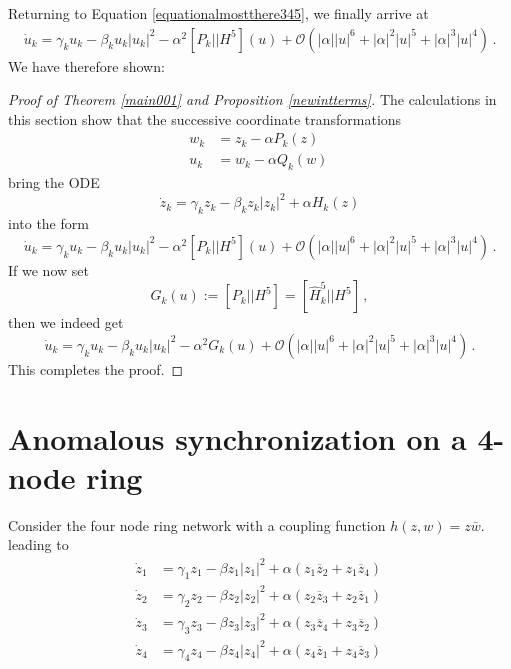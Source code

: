 \documentclass[12pt]{article}
\renewcommand{\mathcal}{\mathscr}
\theoremstyle{plain}
\theoremstyle{definition}
\theoremstyle{remark}
\theoremstyle{remark}
\begin{document}
Returning to Equation \eqref{equationalmostthere345}, we finally arrive at
\begin{align}\label{thethetheequation}
 \dot{u}_k = \gamma_ku_k - \beta_k u_k|u_k|^2  - \alpha^2[P_k|| {H}^5](u) + \mathcal{O}(|\alpha||u|^6 + |\alpha|^2|u|^5 + |\alpha|^3|u|^4)  \, .
\end{align}
We have therefore shown:
\begin{proof}[Proof of Theorem \ref{main001} and Proposition \ref{newintterms}]
The calculations in this section show that the successive coordinate transformations 
\begin{align}
  w_k &= z_k - \alpha P_k(z) \\ \nonumber
  u_k &= w_k - \alpha Q_k(w)\,
\end{align}
bring the ODE 
$$\dot{z}_k = \gamma_kz_k - \beta_k z_k|z_k|^2 + \alpha H_k(z)$$  
into the form
$$ \dot{u}_k = \gamma_ku_k - \beta_k u_k|u_k|^2  - \alpha^2[P_k|| {H}^5](u) + \mathcal{O}(|\alpha||u|^6 + |\alpha|^2|u|^5 + |\alpha|^3|u|^4)  \, .$$
If we now set $$G_k(u) := [P_k|| {H}^5] = [\widehat{H}^5_k|| {H}^5]\, ,$$
then we indeed get 
$$ \dot{u}_k = \gamma_ku_k - \beta_k u_k|u_k|^2  - \alpha^2G_k(u) + \mathcal{O}(|\alpha||u|^6 + |\alpha|^2|u|^5 + |\alpha|^3|u|^4)  \, .$$
This completes the proof.
\end{proof}

\newpage


\section{Anomalous synchronization on a 4-node ring}\label{anomalous}

Consider the four node ring network with a coupling function
$
h(z,w) = z \bar w. 
$
\noindent
leading to 
\begin{align}\label{example1_ode}
\dot{z}_1 &= \gamma_1z_1 - \beta z_1|z_1|^2 + \alpha (z_1\overline{z}_2 + z_1\overline{z}_4 )\\ \nonumber
\dot{z}_2 &= \gamma_2z_2 - \beta z_2|z_2|^2 + \alpha (z_2\overline{z}_3 + z_2\overline{z}_1 ) \\ \nonumber 
\dot{z}_3 &= \gamma_3z_3 - \beta z_3|z_3|^2 + \alpha (z_3\overline{z}_4 + z_3\overline{z}_2 ) \\ \nonumber
\dot{z}_4 &= \gamma_4z_4 - \beta z_4|z_4|^2 + \alpha (z_4\overline{z}_1 + z_4\overline{z}_3 ) \, 
\end{align}
\end{document}
